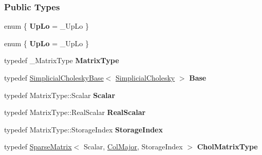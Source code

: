 \subsubsection*{Public Types}
\begin{DoxyCompactItemize}
\item 
\mbox{\label{group___sparse_cholesky___module_aaa5d1f3644369a50abb9486f2f95475e}} 
enum \{ {\bfseries Up\+Lo} = \+\_\+\+Up\+Lo
 \}
\item 
\mbox{\label{group___sparse_cholesky___module_a871125681a534d7d031ae00b7774f7d5}} 
enum \{ {\bfseries Up\+Lo} = \+\_\+\+Up\+Lo
 \}
\item 
\mbox{\label{group___sparse_cholesky___module_aa1b165c53eeb528234a8de0f233760a3}} 
typedef \+\_\+\+Matrix\+Type {\bfseries Matrix\+Type}
\item 
\mbox{\label{group___sparse_cholesky___module_a6757d9f8f6d495673db87523c488ce5a}} 
typedef \hyperlink{group___sparse_cholesky___module_class_eigen_1_1_simplicial_cholesky_base}{Simplicial\+Cholesky\+Base}$<$ \hyperlink{group___sparse_cholesky___module_class_eigen_1_1_simplicial_cholesky}{Simplicial\+Cholesky} $>$ {\bfseries Base}
\item 
\mbox{\label{group___sparse_cholesky___module_a7c9d5750181ae983f05621d8fa9bf10f}} 
typedef Matrix\+Type\+::\+Scalar {\bfseries Scalar}
\item 
\mbox{\label{group___sparse_cholesky___module_a398cad206f425e156e7d4a07c33e1290}} 
typedef Matrix\+Type\+::\+Real\+Scalar {\bfseries Real\+Scalar}
\item 
\mbox{\label{group___sparse_cholesky___module_afdf439e67a29ef03ca6128f36b43a24d}} 
typedef Matrix\+Type\+::\+Storage\+Index {\bfseries Storage\+Index}
\item 
\mbox{\label{group___sparse_cholesky___module_a02a3b97b214580475504aff2c2cceb32}} 
typedef \hyperlink{group___sparse_core___module_class_eigen_1_1_sparse_matrix}{Sparse\+Matrix}$<$ Scalar, \hyperlink{group__enums_ggaacded1a18ae58b0f554751f6cdf9eb13a0cbd4bdd0abcfc0224c5fcb5e4f6669a}{Col\+Major}, Storage\+Index $>$ {\bfseries Chol\+Matrix\+Type}

\end{DoxyCompactItemize}
